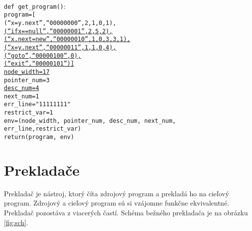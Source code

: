 \texttt{
\\
def get\_program()$\colon$\\
\tab program=[\\
\tab \tab (``x=y.next'',``00000000'',2,1,0,1),\\
\underline{\tab \tab (``ifx==null'',``00000001'',2,5,2),}\\
\underline{\tab \tab (``x.next=new'',``00000010'',1,0,3,3,1),}\\
\underline{\tab \tab (``x=y.next'',``00000011'',1,1,0,4),}\\
\underline{\tab \tab (``goto'',``00000100'',0),}\\
\underline{\tab \tab (``exit'',``00000101'')]}\\
\underline{\tab node\_width=17}\\
\tab pointer\_num=3\\
\underline{\tab desc\_num=4}\\
\tab next\_num=1\\
\tab err\_line="11111111"\\
\tab restrict\_var=1\\
\tab env=(node\_width, pointer\_num, desc\_num, next\_num, err\_line,restrict\_var)\\
\tab return(program, env)
}

\chapter{Prekladače}
\label{kap_prekladace}
Prekladač je nástroj, ktorý číta zdrojový program a prekladá ho na cieľový program.
Zdrojový a cieľový program sú si vzájomne funkčne ekvivalentné\cite{meduna}.
Prekladač pozostáva z viacerých častí. Schéma bežného prekladača je na obrázku \ref{fig:sch}.


